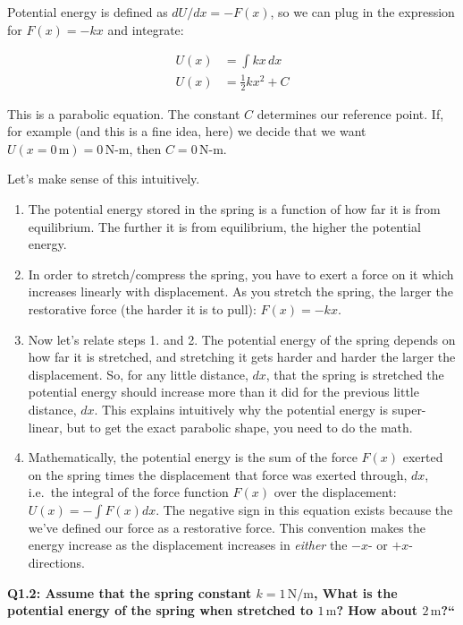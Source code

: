 \documentclass{book}
\providecommand{\tightlist}{%
  \setlength{\itemsep}{0pt}\setlength{\parskip}{0pt}}
\begin{document}
Potential energy is defined as \(dU/dx = -F(x)\), so we can plug in the
expression for \(F(x) = -kx\) and integrate:

\begin{align*}   U(x) &= \int kx\,dx\\    U(x) &= \frac{1}{2}kx^2 + C \end{align*}

This is a parabolic equation. The constant \(C\) determines our reference
point. If, for example (and this is a fine idea, here) we decide that we want
\(U(x=0 \,\text{m}) = 0 \,\text{N-m}\), then \(C = 0 \,\text{N-m}\).

Let's make sense of this intuitively.

\begin{enumerate}
\def\labelenumi{\arabic{enumi}.}
\tightlist
\item
  The potential energy stored in the spring is a function of how far it is
  from equilibrium. The further it is from equilibrium, the higher the
  potential energy.
\item
  In order to stretch/compress the spring, you have to exert a force on it
  which increases linearly with displacement. As you stretch the spring, the
  larger the restorative force (the harder it is to pull): \(F(x)=-kx\).
\item
  Now let's relate steps 1. and 2. The potential energy of the spring depends
  on how far it is stretched, and stretching it gets harder and harder the
  larger the displacement. So, for any little distance, \(dx\), that the
  spring is stretched the potential energy should increase more than it did
  for the previous little distance, \(dx\). This explains intuitively why the
  potential energy is super-linear, but to get the exact parabolic shape, you
  need to do the math.
\item
  Mathematically, the potential energy is the sum of the force \(F(x)\)
  exerted on the spring times the displacement that force was exerted through,
  \(dx\), i.e.~the integral of the force function \(F(x)\) over the
  displacement: \(U(x)= -\int F(x)dx\). The negative sign in this equation
  exists because the we've defined our force as a restorative force. This
  convention makes the energy increase as the displacement increases in
  \emph{either} the \(-x\)- or \(+x\)-directions.
\end{enumerate}

\textbf{Q1.2: Assume that the spring constant \(k = 1\,\mathrm{N/m}\), What is
the potential energy of the spring when stretched to \(1 \,\mathrm{m}\)? How
about \(2 \,\mathrm{m}\)?{}``}
\end{document}
